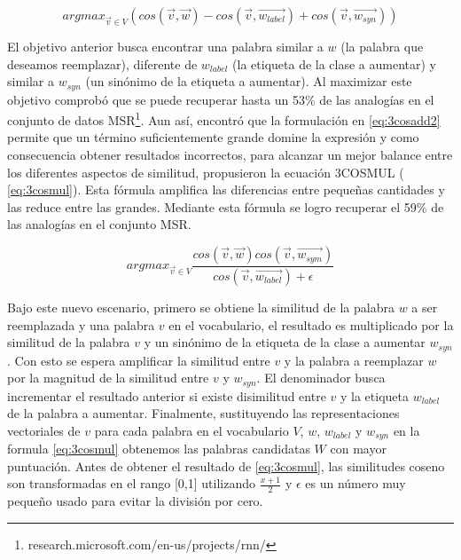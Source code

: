 \begin{equation}
\label{eq:3cosadd2}
    arg max_{\vec{v}\in V}( cos(\vec{v}, \vec{w}) - cos(\vec{v}, \vec{w_{label}}) + cos(\vec{v}, \vec{w_{syn}}) )
    \end{equation}

El objetivo anterior busca encontrar una palabra similar a $w$ (la palabra que deseamos reemplazar), diferente de $w_{label}$ (la etiqueta de la clase a aumentar) y similar a $w_{syn}$ (un sinónimo de la etiqueta a aumentar). Al maximizar este objetivo \citep{mikolov2013distributed} comprobó que se puede recuperar hasta un 53\% de las analogías en el conjunto de datos MSR\footnote{research.microsoft.com/en-us/projects/rnn/}. Aun así, \citep{levy2014linguistic} encontró que la formulación en \ref{eq:3cosadd2} permite que un término suficientemente grande domine la expresión y como consecuencia obtener resultados incorrectos, para alcanzar un mejor balance entre los diferentes aspectos de similitud, propusieron la ecuación 3COSMUL ( \ref{eq:3cosmul}). Esta fórmula amplifica las diferencias entre pequeñas cantidades y las reduce entre las grandes. Mediante esta fórmula se logro recuperar el 59\% de las analogías en el conjunto MSR.

\begin{equation}
    \label{eq:3cosmul}
    arg max_{\vec{v}\in V} \frac{ cos(\vec{v}, \vec{w}) cos(\vec{v}, \vec{w_{sym}})}
    { cos(\vec{v}, \vec{w_{label}})+ \epsilon}
\end{equation}

Bajo este nuevo escenario, primero se obtiene la similitud de la palabra $w$ a ser reemplazada y una palabra $v$ en el vocabulario, el resultado es multiplicado por la similitud de la palabra $v$ y un sinónimo de la etiqueta de la clase a aumentar $w_{syn}$. Con esto se espera amplificar la similitud entre $v$ y la palabra a reemplazar $w$ por la magnitud de la similitud entre $v$ y $w_{syn}$. El denominador busca incrementar el resultado anterior si existe disimilitud entre $v$ y la etiqueta $w_{label}$ de la palabra a aumentar. 
Finalmente, sustituyendo las representaciones vectoriales de $v$ para cada palabra en el vocabulario $V$, $w$, $w_{label}$ y $w_{syn}$ en la formula \ref{eq:3cosmul} obtenemos las palabras candidatas $W$ con mayor puntuación. Antes de obtener el resultado de \ref{eq:3cosmul}, las similitudes coseno son transformadas en el rango [0,1] utilizando $\frac{x+1}{2}$ y $\epsilon$ es un número muy pequeño usado para evitar la división por cero.

